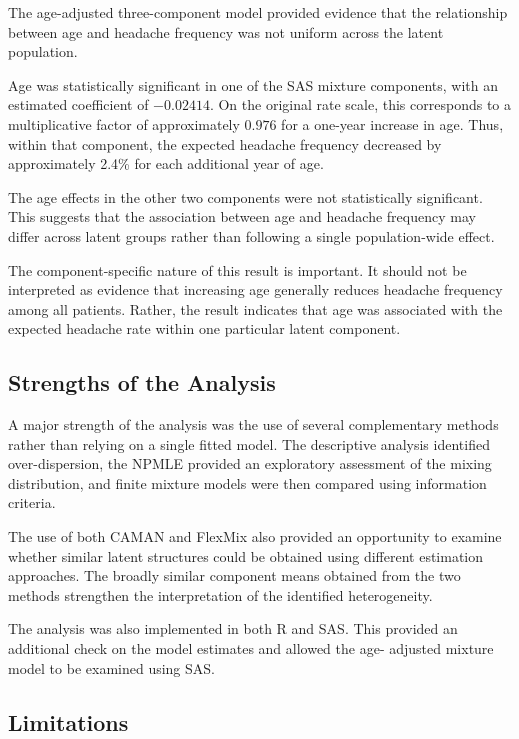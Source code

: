 The age-adjusted three-component model provided evidence that the
relationship between age and headache frequency was not uniform
across the latent population.

Age was statistically significant in one of the SAS mixture
components, with an estimated coefficient of $-0.02414$. On the
original rate scale, this corresponds to a multiplicative factor of
approximately $0.976$ for a one-year increase in age. Thus, within
that component, the expected headache frequency decreased by
approximately 2.4\% for each additional year of age.

The age effects in the other two components were not statistically
significant. This suggests that the association between age and
headache frequency may differ across latent groups rather than
following a single population-wide effect.

The component-specific nature of this result is important. It should
not be interpreted as evidence that increasing age generally reduces
headache frequency among all patients. Rather, the result indicates
that age was associated with the expected headache rate within one
particular latent component.

\subsection{Strengths of the Analysis}

A major strength of the analysis was the use of several complementary
methods rather than relying on a single fitted model. The descriptive
analysis identified over-dispersion, the NPMLE provided an
exploratory assessment of the mixing distribution, and finite
mixture models were then compared using information criteria.

The use of both CAMAN and FlexMix also provided an opportunity to
examine whether similar latent structures could be obtained using
different estimation approaches. The broadly similar component means
obtained from the two methods strengthen the interpretation of the
identified heterogeneity.

The analysis was also implemented in both R and SAS. This provided
an additional check on the model estimates and allowed the age-
adjusted mixture model to be examined using SAS.

\subsection{Limitations}

